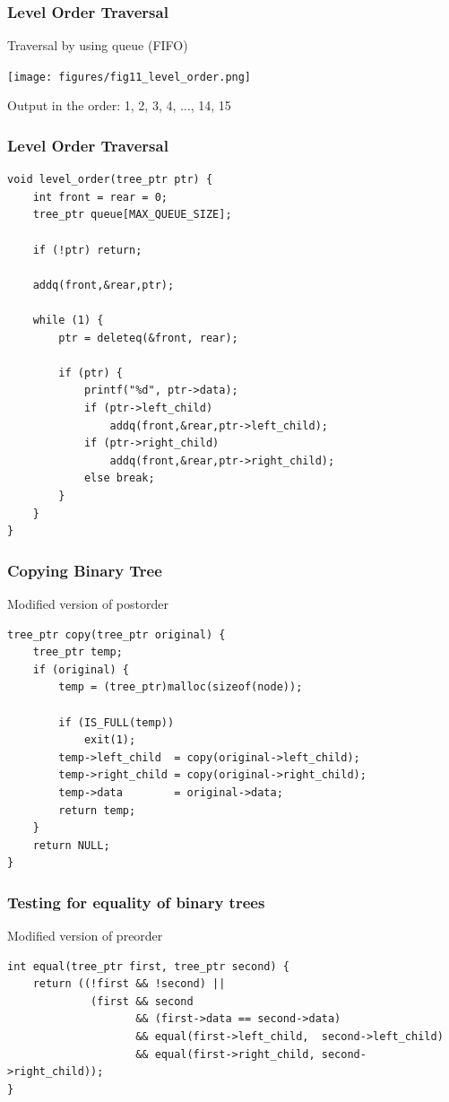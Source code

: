 \documentclass[newPxFont,sthlmFooter,nooffset]{beamer}
\begin{document}
\begin{frame}[t]
  \frametitle{Level Order Traversal}
Traversal by using queue (FIFO)

  \begin{center}
    \texttt{[image: figures/fig11\_level\_order.png]}
  \end{center}

Output in the order: 1, 2, 3, 4, $\ldots$, 14, 15
\end{frame}


\begin{frame}[t, fragile]
  \frametitle{Level Order Traversal}
  \begin{lstlisting}
void level_order(tree_ptr ptr) { 
    int front = rear = 0;
    tree_ptr queue[MAX_QUEUE_SIZE]; 

    if (!ptr) return; 

    addq(front,&rear,ptr);

    while (1) {
        ptr = deleteq(&front, rear); 

        if (ptr) {
            printf("%d", ptr->data); 
            if (ptr->left_child)
                addq(front,&rear,ptr->left_child); 
            if (ptr->right_child)
                addq(front,&rear,ptr->right_child); 
            else break;
        }
    } 
}    
  \end{lstlisting}
\end{frame}


\begin{frame}[t, fragile]
  \frametitle{Copying Binary Tree}
Modified version of postorder
\begin{lstlisting}
tree_ptr copy(tree_ptr original) {
    tree_ptr temp; 
    if (original) {
        temp = (tree_ptr)malloc(sizeof(node)); 

        if (IS_FULL(temp)) 
            exit(1); 
        temp->left_child  = copy(original->left_child); 
        temp->right_child = copy(original->right_child); 
        temp->data        = original->data; 
        return temp;
    }
    return NULL; 
}  
\end{lstlisting}
\end{frame}


\begin{frame}[t, fragile]
  \frametitle{Testing for equality of binary trees}
Modified version of preorder
\begin{lstlisting}
int equal(tree_ptr first, tree_ptr second) {
    return ((!first && !second) || 
             (first && second 
                    && (first->data == second->data) 
                    && equal(first->left_child,  second->left_child) 
                    && equal(first->right_child, second->right_child));
}
\end{lstlisting}
\end{frame}
\end{document}
